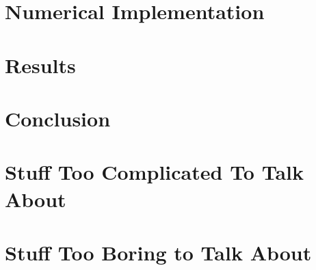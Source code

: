 \documentclass[12pt]{report}   %
\begin{document}
\chapter{Numerical Implementation}

\clearpage{\pagestyle{empty}\cleardoublepage}

\chapter{Results}

\clearpage{\pagestyle{empty}\cleardoublepage}

% 

\chapter{Conclusion}

\clearpage{\pagestyle{empty}\cleardoublepage}

\appendix
\chapter{Stuff Too Complicated To Talk About}

\clearpage{\pagestyle{empty}\cleardoublepage}

\chapter{Stuff Too Boring to Talk About}

\clearpage{\pagestyle{empty}\cleardoublepage}



\begin{spacing}{0.9}
  
\end{spacing}
\end{document}
